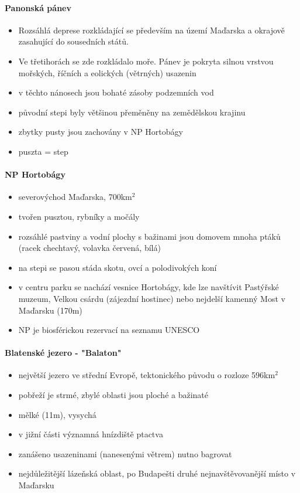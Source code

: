 \paragraph{Panonská pánev}
\begin{itemize}
\item Rozsáhlá deprese rozkládající se především na území Maďarska a okrajově zasahující do sousedních států.
\item Ve třetihorách se zde rozkládalo moře. Pánev je pokryta silnou vrstvou mořských, říčních a eolických (větrných) usazenin
\item v těchto nánosech jsou bohaté zásoby podzemních vod
\item původní stepi byly většinou přeměněny na zemědělskou krajinu
\item zbytky pusty jsou zachovány v NP Hortobágy
\item puszta = step
\end{itemize}

\paragraph{NP Hortobágy}
\begin{itemize}
\item severovýchod Maďarska, 700km$^2$
\item tvořen pusztou, rybníky a močály
\item rozsáhlé pastviny a vodní plochy s bažinami jsou domovem mnoha ptáků (racek chechtavý, volavka červená, bílá)
\item na stepi se pasou stáda skotu, ovcí a polodivokých koní
\item v centru parku se nachází vesnice Hortobágy, kde lze navštívit Pastýřské muzeum, Velkou csárdu (zájezdní hostinec) nebo nejdelší kamenný Most v Maďarsku (170m)
\item NP je biosférickou rezervací na seznamu UNESCO
\end{itemize}

\paragraph{Blatenské jezero - "Balaton"}
\begin{itemize}
\item největší jezero ve střední Evropě, tektonického původu o rozloze 596km$^2$
\item pobřeží je strmé, zbylé oblasti jsou ploché a bažinaté
\item mělké (11m), vysychá
\item v jižní části významná hnízdiště ptactva
\item zanášeno usazeninami (nanesenými větrem) \ra nutno bagrovat
\item nejdůležitější lázeňská oblast, po Budapešti druhé nejnavštěvovanější místo v Maďarsku
\end{itemize}

